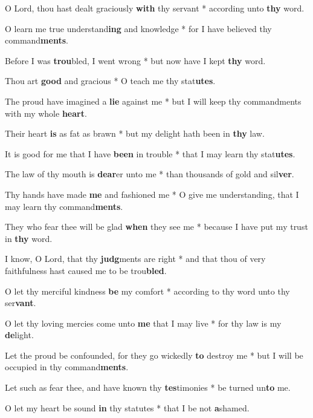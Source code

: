 \begin{multicols}{2}
	O Lord, thou hast dealt graciously \textbf{with} thy servant * according unto \textbf{thy} word.
	
	O learn me true understand\textbf{ing} and knowledge * for I have believed thy command\textbf{ments}.
	
	Before I was \textbf{trou}bled, I went wrong * but now have I kept \textbf{thy} word.
	
	Thou art \textbf{good} and gracious * O teach me thy stat\textbf{utes}.
	
	The proud have imagined a \textbf{lie} against me * but I will keep thy commandments with my whole \textbf{heart}.
	
	Their heart \textbf{is} as fat as brawn * but my delight hath been in \textbf{thy} law.
	
	It is good for me that I have \textbf{been} in trouble * that I may learn thy stat\textbf{utes}.
	
	The law of thy mouth is \textbf{dear}er unto me * than thousands of gold and sil\textbf{ver}.
	
	Thy hands have made \textbf{me} and fashioned me * O give me understanding, that I may learn thy command\textbf{ments}.
	
	They who fear thee will be glad \textbf{when} they see me * because I have put my trust in \textbf{thy} word.
	
	I know, O Lord, that thy \textbf{judg}ments are right * and that thou of very faithfulness hast caused me to be trou\textbf{bled}.
	
	O let thy merciful kindness \textbf{be} my comfort * according to thy word unto thy ser\textbf{vant}.
	
	O let thy loving mercies come unto \textbf{me} that I may live * for thy law is my \textbf{de}light.
	
	Let the proud be confounded, for they go wickedly \textbf{to} destroy me * but I will be occupied in thy command\textbf{ments}.
	
	Let such as fear thee, and have known thy \textbf{tes}timonies * be turned un\textbf{to} me.
	
	O let my heart be sound \textbf{in} thy statutes * that I be not \textbf{a}shamed.
\end{multicols}